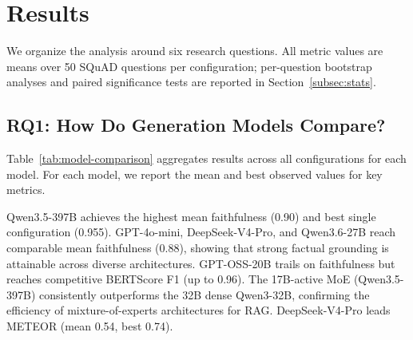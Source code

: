 \section{Results}
\label{sec:results}

We organize the analysis around six research questions. All metric values are means over 50 SQuAD questions per configuration; per-question bootstrap analyses and paired significance tests are reported in Section~\ref{subsec:stats}.

\subsection{RQ1: How Do Generation Models Compare?}

Table~\ref{tab:model-comparison} aggregates results across all configurations for each model. For each model, we report the mean and best observed values for key metrics.

\begin{table}[t]
\centering
\caption{Model comparison: mean and (best) across all configurations. Faithfulness (Faith.), nDCG@5, BERTScore F1 (BS-F1), and METEOR are reported.}
\label{tab:model-comparison}
\end{table}

Qwen3.5-397B achieves the highest mean faithfulness (0.90) and best single configuration (0.955). GPT-4o-mini, DeepSeek-V4-Pro, and Qwen3.6-27B reach comparable mean faithfulness (0.88), showing that strong factual grounding is attainable across diverse architectures. GPT-OSS-20B trails on faithfulness but reaches competitive BERTScore F1 (up to 0.96). The 17B-active MoE (Qwen3.5-397B) consistently outperforms the 32B dense Qwen3-32B, confirming the efficiency of mixture-of-experts architectures for RAG. DeepSeek-V4-Pro leads METEOR (mean 0.54, best 0.74).

